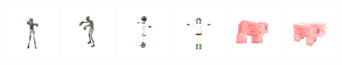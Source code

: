 \begin{figure}[htbp]
  \includegraphics[width=0.15\textwidth]{images/data/samples/16.1.jpeg}\hspace{0.01\textwidth}%
  \includegraphics[width=0.15\textwidth]{images/data/samples/16.2.jpeg}\hfill
  \includegraphics[width=0.15\textwidth]{images/data/samples/25.1.jpeg}\hspace{0.01\textwidth}%
  \includegraphics[width=0.15\textwidth]{images/data/samples/25.2.jpeg}\hfill
  \includegraphics[width=0.15\textwidth]{images/data/samples/18.1.jpeg}\hspace{0.01\textwidth}%
  \includegraphics[width=0.15\textwidth]{images/data/samples/18.2.jpeg} \\\\
  \vspace{2mm}


\end{figure}
